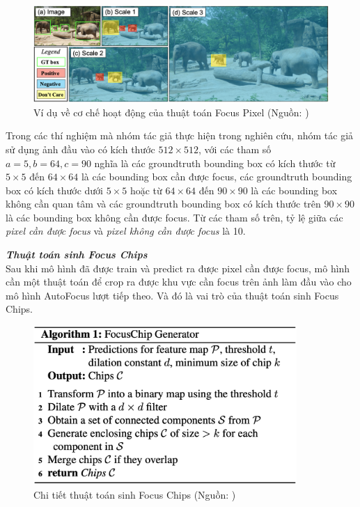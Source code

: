 {    \begin{figure}[H]
        \centering
        \includegraphics[width=15cm] {images/autofocus_focus_pixel}
        \caption{Ví dụ về cơ chế hoạt động của thuật toán Focus Pixel (Nguồn: \cite{najibi2019autofocus})}
        \label{fig:autofocus_focus_pixel}
    \end{figure}

    \noindent
    Trong các thí nghiệm mà nhóm tác giả thực hiện trong nghiên cứu, nhóm tác giả sử dụng ảnh đầu vào có kích thước $512 \times 512$, với các tham số $a = 5, b = 64, c = 90$ nghĩa là các groundtruth bounding box có kích thước từ $5 \times 5$ đến $64 \times 64$ là các bounding box cần được focus, các groundtruth bounding box có kích thước dưới $5 \times 5$ hoặc từ $64 \times 64$ đến $90 \times 90$ là các bounding box không cần quan tâm và các groundtruth bounding box có kích thước trên $90 \times 90$ là các bounding box không cần được focus.
    Từ các tham số trên, tỷ lệ giữa các \textit{pixel cần được focus} và \textit{pixel không cần được focus} là 10.

    \noindent
    \textbf{\textit{Thuật toán sinh Focus Chips}} \\
    Sau khi mô hình đã được train và predict ra được pixel cần được focus, mô hình cần một thuật toán để crop ra được khu vực cần focus trên ảnh làm đầu vào cho mô hình AutoFocus lượt tiếp theo.
    Và đó là vai trò của thuật toán sinh Focus Chips.

    \begin{figure}[H]
        \centering
        \includegraphics[width=10cm] {images/autofocus_focus_chip_gen}
        \caption{Chi tiết thuật toán sinh Focus Chips (Nguồn: \cite{najibi2019autofocus})}
        \label{fig:autofocus_focus_chip_gen}
    \end{figure}

}
